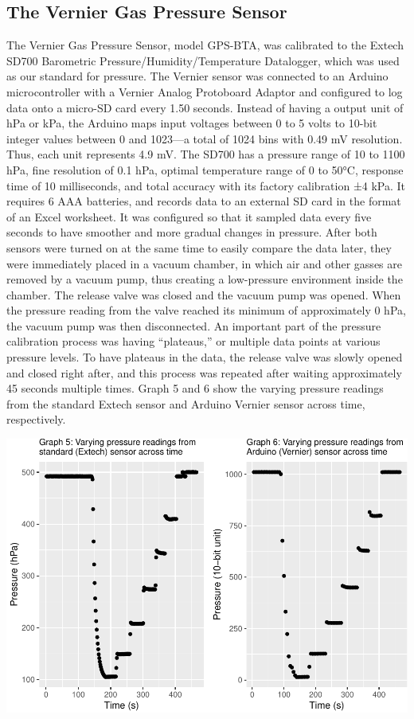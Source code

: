 \documentclass[12pt,]{article}
\begin{document}
\subsection{The Vernier Gas Pressure
Sensor}\label{the-vernier-gas-pressure-sensor}

The Vernier Gas Pressure Sensor, model GPS-BTA, was calibrated to the
Extech SD700 Barometric Pressure/Humidity/Temperature Datalogger, which
was used as our standard for pressure. The Vernier sensor was connected
to an Arduino microcontroller with a Vernier Analog Protoboard Adaptor
and configured to log data onto a micro-SD card every 1.50 seconds.
Instead of having a output unit of hPa or kPa, the Arduino maps input
voltages between 0 to 5 volts to 10-bit integer values between 0 and
1023---a total of 1024 bins with 0.49 mV resolution. Thus, each unit
represents 4.9 mV. The SD700 has a pressure range of 10 to 1100 hPa,
fine resolution of 0.1 hPa, optimal temperature range of 0 to 50°C,
response time of 10 milliseconds, and total accuracy with its factory
calibration ±4 kPa. It requires 6 AAA batteries, and records data to an
external SD card in the format of an Excel worksheet. It was configured
so that it sampled data every five seconds to have smoother and more
gradual changes in pressure. After both sensors were turned on at the
same time to easily compare the data later, they were immediately placed
in a vacuum chamber, in which air and other gasses are removed by a
vacuum pump, thus creating a low-pressure environment inside the
chamber. The release valve was closed and the vacuum pump was opened.
When the pressure reading from the valve reached its minimum of
approximately 0 hPa, the vacuum pump was then disconnected. An important
part of the pressure calibration process was having ``plateaus,'' or
multiple data points at various pressure levels. To have plateaus in the
data, the release valve was slowly opened and closed right after, and
this process was repeated after waiting approximately 45 seconds
multiple times. Graph 5 and 6 show the varying pressure readings from
the standard Extech sensor and Arduino Vernier sensor across time,
respectively.

\includegraphics{paper_files/figure-latex/vernier_calibration-1.pdf}
\end{document}
